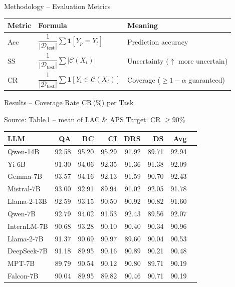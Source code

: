 \documentclass{beamer}
\newcommand{\hrow}{\rowcolor{hlblue}}
\begin{document}
\begin{frame}{Methodology -- Evaluation Metrics}

\renewcommand{\arraystretch}{1.65}
\begin{tabular}{@{}lll@{}}
  \toprule
  \textbf{Metric} & \textbf{Formula} & \textbf{Meaning} \\
  \midrule
  Acc &
    $\dfrac{1}{|\mathcal{D}_{\mathrm{test}}|}\sum\mathbf{1}[Y_p=Y_t]$ &
    Prediction accuracy \\
  SS  &
    $\dfrac{1}{|\mathcal{D}_{\mathrm{test}}|}\sum|\mathcal{C}(X_t)|$ &
    Uncertainty ($\uparrow$ more uncertain) \\
  CR  &
    $\dfrac{1}{|\mathcal{D}_{\mathrm{test}}|}\sum\mathbf{1}[Y_t\in\mathcal{C}(X_t)]$ &
    Coverage ($\geq1{-}\alpha$ guaranteed) \\
  \bottomrule
\end{tabular}


\end{frame}

\begin{frame}{Results -- Coverage Rate CR\,(\%) per Task}

\begin{block}{\scriptsize Source: Table\,1 -- mean of LAC \& APS \quad Target: CR $\geq 90\%$}
\scriptsize
\renewcommand{\arraystretch}{1.12}
\begin{center}
\begin{tabular}{lrrrrrrr}
\toprule
\textbf{LLM} & \textbf{QA} & \textbf{RC} & \textbf{CI} & \textbf{DRS} & \textbf{DS} & \textbf{Avg} \\
\midrule
\hrow Qwen-14B   & 92.58 & 95.20 & 95.29 & 91.92 & 89.71 & 92.94 \\
Yi-6B            & 91.30 & 94.06 & 92.35 & 91.36 & 91.38 & 92.09 \\
Gemma-7B         & 93.57 & 94.16 & 92.13 & 91.59 & 90.70 & 92.43 \\
Mistral-7B       & 93.00 & 92.91 & 89.94 & 91.02 & 92.05 & 91.78 \\
Llama-2-13B      & 92.59 & 93.15 & 90.50 & 90.92 & 90.82 & 91.60 \\
Qwen-7B          & 92.79 & 94.02 & 91.53 & 92.43 & 89.56 & 92.07 \\
InternLM-7B      & 90.68 & 93.28 & 90.10 & 90.40 & 90.34 & 90.96 \\
Llama-2-7B       & 91.37 & 90.69 & 90.97 & 89.60 & 90.04 & 90.53 \\
DeepSeek-7B      & 91.18 & 89.95 & 90.16 & 90.89 & 90.21 & 90.48 \\
MPT-7B           & 89.79 & 90.54 & 90.12 & 90.80 & 89.71 & 90.19 \\
Falcon-7B        & 90.04 & 89.95 & 89.82 & 90.46 & 90.71 & 90.19 \\
\bottomrule
\end{tabular}
\end{center}
\end{block}

\end{frame}
\end{document}
